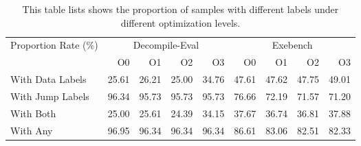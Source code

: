 \begin{table}[t]
\centering
\begin{tabular}{lrrrrrrrr}
\toprule
\multirow{2}{*}{Proportion Rate (\%)} & \multicolumn{4}{c}{Decompile-Eval}  & \multicolumn{4}{c}{Exebench} \\ \cmidrule(lr){2-5} \cmidrule(lr){6-9}
                         & O0     & O1     & O2     & O3     & O0       & O1      & O2      & O3     \\ \midrule
With Data Labels         & 25.61  & 26.21  & 25.00  & 34.76  & 47.61    & 47.62   & 47.75   & 49.01   \\
With Jump Labels         & 96.34  & 95.73  & 95.73  & 95.73  & 76.66    & 72.19   & 71.57   & 71.20   \\ 
With Both                & 25.00  & 25.61  & 24.39  & 34.15  & 37.67    & 36.74   & 36.81   & 37.88   \\
With Any                 & 96.95  & 96.34  & 96.34  & 96.34  & 86.61    & 83.06   & 82.51   & 82.33   \\  \bottomrule
\end{tabular}
  \caption{This table lists shows the proportion of samples with different labels under different optimization levels.}
  \label{tab:dataset-rate}
\end{table}